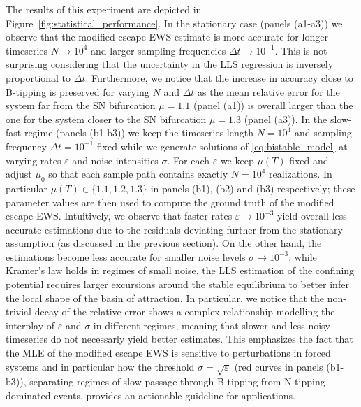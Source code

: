 \documentclass[a4paper,fleqn]{cas-sc}
\newcommand{\fref}[1]{Figure~\ref{#1}}
\begin{document}
The results of this experiment are depicted in \fref{fig:statistical_performance}.
In the stationary case (panels (a1-a3)) we observe that the modified escape EWS estimate is more accurate for longer timeseries $N\to10^4$ and larger sampling frequencies $\Delta t\to10^{-1}$.
This is not surprising considering that the uncertainty in the LLS regression is inversely proportional to $\Delta t$.
Furthermore, we notice that the increase in accuracy close to B-tipping is preserved for varying $N$ and $\Delta t$ as the mean relative error for the system far from the SN bifurcation $\mu=1.1$ (panel (a1)) is overall larger than the one for the system closer to the SN bifurcation $\mu=1.3$ (panel (a3)).
In the slow-fast regime (panels (b1-b3)) we keep the timeseries length $N=10^4$ and sampling frequency $\Delta t=10^{-1}$ fixed while we generate solutions of \eqref{eq:bistable_model} at varying rates $\varepsilon$ and noise intensities $\sigma$.
For each $\varepsilon$ we keep $\mu(T)$ fixed and adjust $\mu_0$ so that each sample path contains exactly $N=10^4$ realizations.
In particular $\mu(T)\in\{1.1,1.2,1.3\}$ in panels (b1), (b2) and (b3) respectively; these parameter values are then used to compute the ground truth of the modified escape EWS.
Intuitively, we observe that faster rates $\varepsilon\to10^{-3}$ yield overall less accurate estimations due to the residuals deviating further from the stationary assumption (as discussed in the previous section).
On the other hand, the estimations become less accurate for smaller noise levels $\sigma\to10^{-3}$; while Kramer's law holds in regimes of small noise, the LLS estimation of the confining potential requires larger excursions around the stable equilibrium to better infer the local shape of the basin of attraction.
In particular, we notice that the non-trivial decay of the relative error shows a complex relationship modelling the interplay of $\varepsilon$ and $\sigma$ in different regimes, meaning that slower and less noisy timeseries do not necessarly yield better estimates.
This emphasizes the fact that the MLE of the modified escape EWS is sensitive to perturbations in forced systems and in particular how the threshold $\sigma=\sqrt{\varepsilon}$ (red curves in panels (b1-b3)), separating regimes of slow passage through B-tipping from N-tipping dominated events, provides an actionable guideline for applications.
\end{document}
